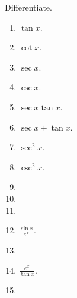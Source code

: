 Differentiate.

\begin{multicols}{2}
\begin{enumerate}
\item $\tan x$.

\item $\cot x$.

\item $\sec x$.

\item $\csc x$.

\item $\sec x\tan x$.

\item $\sec x+\tan x$.

\item $\sec^2 x$.

\item $\csc^2 x$.


\item 
\item 

\item 
\item $\displaystyle \frac{\sin x}{e^x}$.

\item 
\item $\displaystyle \frac{e^x}{\tan x}$.

\item 
\end{enumerate}

\end{multicols}